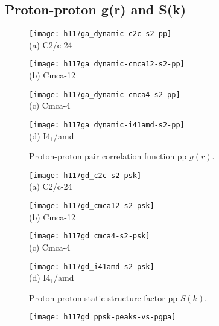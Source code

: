 \subsection{Proton-proton g(r) and S(k)}

\begin{figure}[h]
\centering
\begin{minipage}{0.49\textwidth}
\centering
\texttt{[image: h117ga\_dynamic-c2c-s2-pp]}\\
(a) C2/c-24
\end{minipage}
\begin{minipage}{0.49\textwidth}
\centering
\texttt{[image: h117ga\_dynamic-cmca12-s2-pp]}\\
(b) Cmca-12
\end{minipage}
\begin{minipage}{0.49\textwidth}
\centering
\texttt{[image: h117ga\_dynamic-cmca4-s2-pp]}\\
(c) Cmca-4
\end{minipage}
\begin{minipage}{0.49\textwidth}
\centering
\texttt{[image: h117ga\_dynamic-i41amd-s2-pp]}\\
(d) I4$_1$/amd
\end{minipage}
\caption{Proton-proton pair correlation function pp $g(r)$.}
\label{fig:hsolid-ppgr}
\end{figure}

\begin{figure}[h]
\centering
\begin{minipage}{0.49\textwidth}
\centering
\texttt{[image: h117gd\_c2c-s2-psk]}\\
(a) C2/c-24
\end{minipage}
\begin{minipage}{0.49\textwidth}
\centering
\texttt{[image: h117gd\_cmca12-s2-psk]}\\
(b) Cmca-12
\end{minipage}
\begin{minipage}{0.49\textwidth}
\centering
\texttt{[image: h117gd\_cmca4-s2-psk]}\\
(c) Cmca-4
\end{minipage}
\begin{minipage}{0.49\textwidth}
\centering
\texttt{[image: h117gd\_i41amd-s2-psk]}\\
(d) I4$_1$/amd
\end{minipage}
\caption{Proton-proton static structure factor pp $S(k)$.}
\label{fig:hsolid-ppsk}
\end{figure}

\begin{figure}[h]
\centering
\texttt{[image: h117gd\_ppsk-peaks-vs-pgpa]}
\end{figure}

